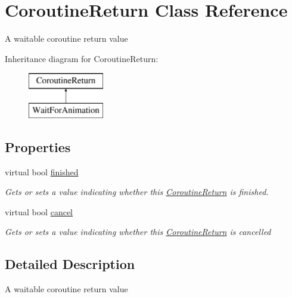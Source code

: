 \hypertarget{class_coroutine_return}{}\section{Coroutine\+Return Class Reference}
\label{class_coroutine_return}


A waitable coroutine return value  


Inheritance diagram for Coroutine\+Return\+:\begin{figure}[H]
\begin{center}
\leavevmode
\includegraphics[height=2.000000cm]{class_coroutine_return}
\end{center}
\end{figure}
\subsection*{Properties}
\begin{DoxyCompactItemize}
\item 
virtual bool \hyperlink{class_coroutine_return_a6498bd9490d9514b662431ee9002a1a1}{finished}
\begin{DoxyCompactList}\small\item\em Gets or sets a value indicating whether this \hyperlink{class_coroutine_return}{Coroutine\+Return} is finished. \end{DoxyCompactList}\item 
virtual bool \hyperlink{class_coroutine_return_ac68a21bc01c95f3fa3a8ab5202cada18}{cancel}
\begin{DoxyCompactList}\small\item\em Gets or sets a value indicating whether this \hyperlink{class_coroutine_return}{Coroutine\+Return} is cancelled \end{DoxyCompactList}\end{DoxyCompactItemize}


\subsection{Detailed Description}
A waitable coroutine return value 



